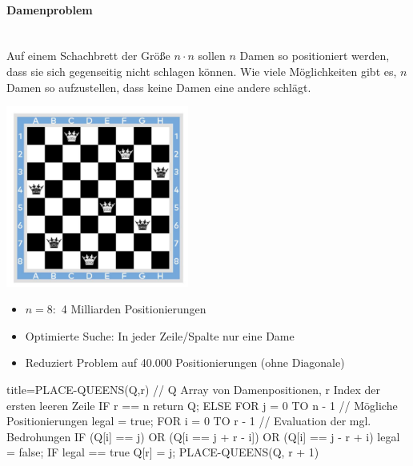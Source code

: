 \documentclass[
    ngerman,
    color=3b,
    dark_mode,
    load_common, %
    summary,
    boxarc,
]{tuda_summary}
\begin{document}
\paragraph{Damenproblem}\mbox{}\\
Auf einem Schachbrett der Grö\ss{}e $n \cdot n$ sollen $n$ Damen so positioniert werden, dass sie sich
gegenseitig nicht schlagen können. Wie viele Möglichkeiten gibt es, $n$ Damen so aufzustellen, dass keine
Damen eine andere schlägt.
\begin{minipage}{7cm}
    \includegraphics[width=6cm]{pictures/damenproblem.PNG}
\end{minipage}
\begin{minipage}{\textwidth-7cm}
    \begin{itemize}
        \item $n=8:$ 4 Milliarden Positionierungen
        \item Optimierte Suche: In jeder Zeile/Spalte nur eine Dame
        \item Reduziert Problem auf 40.000 Positionierungen (ohne Diagonale)
    \end{itemize}
\end{minipage}
\begin{codeBlock}[autogobble]{title={PLACE-QUEENS(Q,r) // Q Array von Damenpositionen, r Index der ersten leeren Zeile}}
    IF r == n
        return Q;
    ELSE
        FOR j = 0 TO n - 1 // Mögliche Positionierungen
            legal = true;
            FOR i = 0 TO r - 1  // Evaluation der mgl. Bedrohungen
                IF (Q[i] == j) OR (Q[i == j + r - i]) OR (Q[i] == j - r + i)
                    legal = false;
            IF legal == true
                Q[r] = j;
                PLACE-QUEENS(Q, r + 1)
\end{codeBlock}
\end{document}
